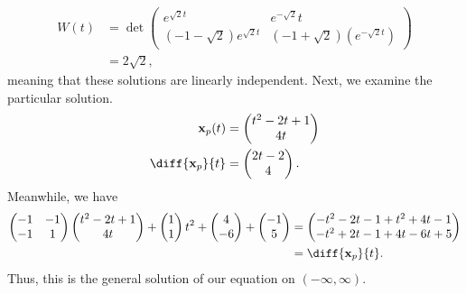 \documentclass[10pt]{mypackage}
\begin{document}
\begin{solution}[8.1, Problem 26]
  \begin{align*}
    W(t) &= \det \begin{pmatrix}e^{\sqrt{2}t} & e^{-\sqrt{2}}t \\ \left( -1-\sqrt{2} \right)e^{\sqrt{2}t} & \left( -1+\sqrt{2} \right)\left( e^{-\sqrt{2}t} \right)\end{pmatrix} \\
         &= 2\sqrt{2},
  \end{align*}
  meaning that these solutions are linearly independent. Next, we examine the particular solution.
  \begin{align*}
    \mathbf{x}_p(t) &= \begin{pmatrix}t^2 - 2t + 1\\4t\end{pmatrix}\\
    \diff{\mathbf{x}_p}{t} &= \begin{pmatrix}2t-2\\4\end{pmatrix}.
  \end{align*}
  Meanwhile, we have
  \begin{align*}
    \begin{pmatrix}-1 & -1 \\ -1 & 1\end{pmatrix} \begin{pmatrix}t^2 - 2t + 1 \\ 4t\end{pmatrix} + \begin{pmatrix}1\\1\end{pmatrix}t^2 + \begin{pmatrix}4\\-6\end{pmatrix} + \begin{pmatrix}-1\\5\end{pmatrix} &= \begin{pmatrix}-t^2-2t-1 + t^2 + 4t - 1 \\ -t^2+2t-1 + 4t - 6t + 5\end{pmatrix}\\
                      &= \diff{\mathbf{x}_{p}}{t}.
  \end{align*}
  Thus, this is the general solution of our equation on $\left( -\infty,\infty \right)$.
\end{solution}
\end{document}
